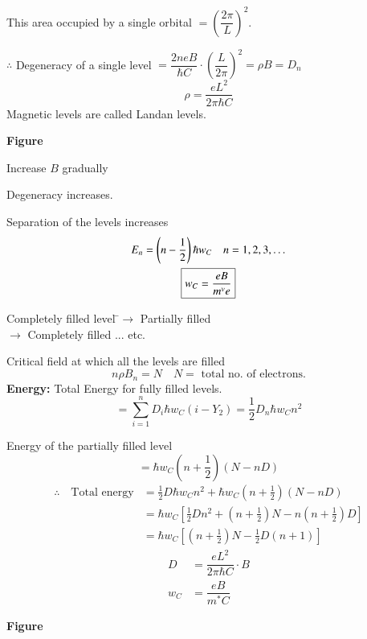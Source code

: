 This area occupied by a single orbital $=\left(\dfrac{2\pi}{L}\right)^{2}$.

$\therefore$ Degeneracy of a single level $=\dfrac{2neB}{\hbar C}\cdot \left(\dfrac{L}{2\pi}\right)^{2}=\rho B=D_{n}$
$$
\rho=\dfrac{eL^{2}}{2\pi\hbar C}
$$
Magnetic levels are called Landan levels.
\begin{center}
{\bf Figure}
\end{center}

Increase $B$ gradually

Degeneracy increases.

Separation of the levels increases
\begin{gather*}
E_{n}=\left(n-\frac{1}{2}\right)\hbar w_{C}\quad n=1,2,3,\ldots\\
\fbox{$w_{C}=\dfrac{eB}{m^{v}e}$}
\end{gather*}

\begin{tabbing}
Completely filled level \=$\to$ Partially filled\\[3pt]
\>$\to$ Completely filled ... etc.
\end{tabbing}

Critical field at which all the levels are filled
$$
n\rho B_{n}=N\quad N=\text{ total no. of electrons.}
$$
{\bf Energy:} Total Energy for fully filled levels.
$$
=\sum\limits^{n}_{i=1}D_{i}\hbar w_{C}(i-Y_{2})=\frac{1}{2}D_{n}\hbar w_{C}n^{2}
$$

Energy of the partially filled level
$$
=\hbar w_{C}\left(n+\frac{1}{2}\right)(N-nD)
$$
\begin{align*}
\therefore\quad \text{Total energy} &= \frac{1}{2}D\hbar w_{C}n^{2}+\hbar w_{C}\left(n+\frac{1}{2}\right)(N-nD)\\
&= \hbar w_{C}\left[\frac{1}{2}Dn^{2}+\left(n+\frac{1}{2}\right)N-n\left(n+\frac{1}{2}\right)D\right]\\
&= \hbar w_{C}\left[\left(n+\frac{1}{2}\right)N-\frac{1}{2}D(n+1)\right]
\end{align*}
\begin{align*}
D &= \dfrac{eL^{2}}{2\pi \hbar C}\cdot B\\
w_{C} &= \dfrac{eB}{m^{*}C}
\end{align*}
\begin{center}
{\bf Figure}
\end{center}


